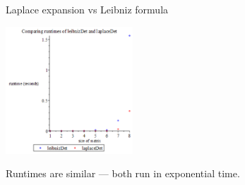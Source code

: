 \documentclass{beamer}
\begin{document}
\begin{frame}{Laplace expansion vs Leibniz formula}
    \begin{center}{}
        \includegraphics[height=180]{leibniz-laplace}
    \end{center}

    Runtimes are similar --- both run in exponential time.
\end{frame}
\end{document}
